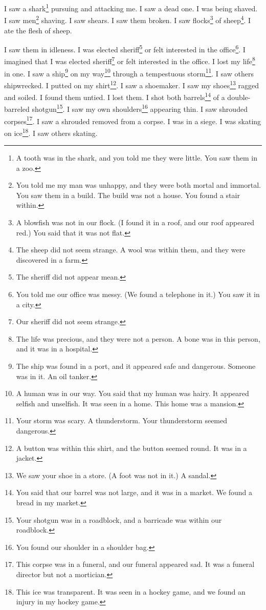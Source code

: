 \documentclass[12pt]{book}
\begin{document}
 I saw a shark\footnote{A tooth was in the shark, and you told me they were little. You saw them in a zoo.} pursuing and attacking me. I saw a dead one. I was being shaved. I saw men\footnote{You told me my man was unhappy, and they were both mortal and immortal. You saw them in a build. The build was not a house. You found a stair within.} shaving. I saw shears. I saw them broken. I saw flocks\footnote{A blowfish was not in our flock. (I found it in a roof, and our roof appeared red.) You said that it was not flat.} of sheep\footnote{The sheep did not seem strange. A wool was within them, and they were discovered in a farm.}. I ate the flesh of sheep. 

 I saw them in idleness. I was elected sheriff\footnote{The sheriff did not appear mean.} or felt interested in the office\footnote{You told me our office was messy. (We found a telephone in it.) You saw it in a city.}. I imagined that I was elected sheriff\footnote{Our sheriff did not seem strange.} or felt interested in the office. I lost my life\footnote{The life was precious, and they were not a person. A bone was in this person, and it was in a hospital.} in one. I saw a ship\footnote{The ship was found in a port, and it appeared safe and dangerous. Someone was in it. An oil tanker.} on my way\footnote{A human was in our way. You said that my human was hairy. It appeared selfish and unselfish. It was seen in a home. This home was a mansion.} through a tempestuous storm\footnote{Your storm was scary. A thunderstorm. Your thunderstorm seemed dangerous.}. I saw others shipwrecked. I putted on my shirt\footnote{A button was within this shirt, and the button seemed round. It was in a jacket.}. I saw a shoemaker. I saw my shoes\footnote{We saw your shoe in a store. (A foot was not in it.) A sandal.} ragged and soiled. I found them untied. I lost them. I shot both barrels\footnote{You said that our barrel was not large, and it was in a market. We found a bread in my market.} of a double-barreled shotgun\footnote{Your shotgun was in a roadblock, and a barricade was within our roadblock.}. I saw my own shoulders\footnote{You found our shoulder in a shoulder bag.} appearing thin. I saw shrouded corpses\footnote{This corpse was in a funeral, and our funeral appeared sad. It was a funeral director but not a mortician.}. I saw a shrouded removed from a corpse. I was in a siege. I was skating on ice\footnote{This ice was transparent. It was seen in a hockey game, and we found an injury in my hockey game.}. I saw others skating. 
\end{document}
